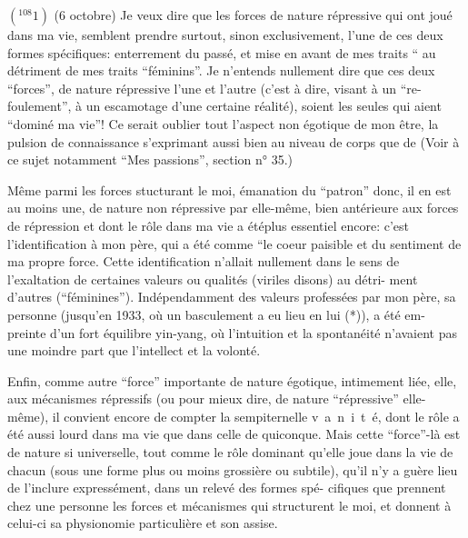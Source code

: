 \(({}^{108}1)\) (6 octobre) Je veux dire que les forces de nature répressive qui ont joué
dans ma vie, semblent prendre surtout, sinon exclusivement, l'une de ces deux
formes spécifiques: enterrement du passé, et mise en avant de mes traits ``
au détriment de mes traits ``féminins''. Je n'entends nullement dire que ces deux
``forces'', de nature répressive l'une et l'autre (c'est à dire, visant à un ``re-\linebreak
foulement'', à un escamotage d'une certaine réalité), soient les seules qui aient
``dominé ma vie''! Ce serait oublier tout l'aspect non égotique de mon être, la
pulsion de connaissance s'exprimant aussi bien au niveau de corps que de 
(Voir à ce sujet notamment ``Mes passions'', section n° 35.)

Même parmi les forces stucturant le moi, émanation du ``patron'' donc, il en
est au moins une, de nature non répressive par elle-même, bien antérieure aux
forces de répression et dont le rôle dans ma vie a été\quad plus essentiel encore:
c'est l'identification à mon père, qui a été comme ``le coeur paisible et 
du sentiment de ma propre force. Cette identification n'allait nullement dans le
sens de l'exaltation de certaines valeurs ou qualités (viriles disons) au détri-\linebreak
ment d'autres (``féminines''). Indépendamment des valeurs professées par mon père,
sa personne (jusqu'en 1933, où un basculement a eu lieu en lui (*)), a été em-\linebreak
preinte d'un fort équilibre yin-yang, où l'intuition et la spontanéité n'avaient
pas une moindre part que l'intellect et la volonté.

Enfin, comme autre ``force'' importante de nature égotique, intimement liée,
elle, aux mécanismes répressifs (ou pour mieux dire, de nature ``répressive''
elle-même), il convient encore de compter la sempiternelle \mbox{v a n i t é}, dont
le rôle a été aussi lourd dans ma vie que dans celle de quiconque. Mais cette
``force''-là est de nature si universelle, tout comme le rôle dominant qu'elle
joue dans la vie de chacun (sous une forme plus ou moins grossière ou subtile),
qu'il n'y a guère lieu de l'inclure expressément, dans un relevé des formes spé-\linebreak
cifiques que prennent chez une personne les forces et mécanismes qui structurent
le moi, et donnent à celui-ci sa physionomie particulière et son assise.

